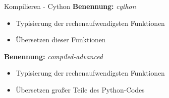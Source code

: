 \begin{frame}{Kompilieren - Cython}
	\textbf{Benennung:} \textit{cython}
	\begin{itemize}
		\item Typisierung der rechenaufwendigsten Funktionen
		\item Übersetzen dieser Funktionen
	\end{itemize}
	
	\vspace{1cm}
	
	\textbf{Benennung:} \textit{compiled-advanced}
	\begin{itemize}
		\item<2> Typisierung der rechenaufwendigsten Funktionen
		\item<2> Übersetzen großer Teile des Python-Codes
	\end{itemize}
\end{frame}

